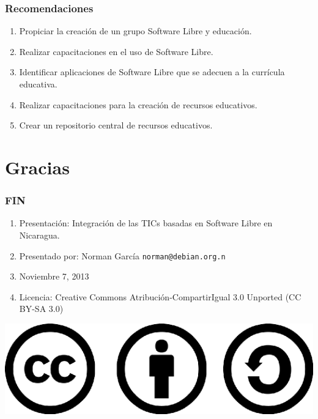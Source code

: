 \documentclass{beamer}
\begin{document}
\begin{frame} 
\frametitle{Recomendaciones}
	\begin{enumerate}
		\pause \item Propiciar la creaci\'on de un grupo Software Libre y educaci\'on.
		\pause \item Realizar capacitaciones en el uso de Software Libre.
		\pause \item Identificar aplicaciones de Software Libre que se adecuen a la curr\'icula educativa.
		\pause \item Realizar capacitaciones para la creaci\'on de recursos educativos.
		\pause \item Crear un repositorio central de recursos educativos.
	\end{enumerate}
\end{frame}


\section{Gracias}


\begin{frame}
\frametitle{FIN}
	\begin{enumerate}
		\pause \item Presentaci\'on: Integraci\'on de las TICs basadas en Software Libre en Nicaragua.
		\pause \item Presentado por: Norman Garc\'ia  \texttt{norman@debian.org.n}
		\pause \item Noviembre 7, 2013
		\pause \item Licencia: Creative Commons Atribuci\'on-CompartirIgual 3.0 Unported (CC BY-SA 3.0)
	\end{enumerate}

	\begin{center}
  		 \includegraphics[scale=0.20]{../img/cclogo.png}
	\end{center}

\end{frame}
\end{document}
